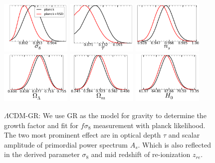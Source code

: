\begin{figure} 
\includegraphics[width=0.3\textwidth]{plots/planck-RSD-GR-sigma8.png}
\includegraphics[width=0.3\textwidth]{plots/planck-RSD-GR-tau.png}
\includegraphics[width=0.3\textwidth]{plots/planck-RSD-GR-ns.png}
\includegraphics[width=0.3\textwidth]{plots/planck-RSD-GR-omegal.png}
\includegraphics[width=0.3\textwidth]{plots/planck-RSD-GR-omegam.png}
\includegraphics[width=0.3\textwidth]{plots/planck-RSD-GR-H0.png}
\caption{ $\Lambda$CDM-GR: We use GR as the model for gravity to determine the growth factor and fit for $f\sigma_8$ measurement with planck likelihood. The two most prominent effect are in optical depth $\tau$ and scalar amplitude of primordial power spectrum $A_s$. Which is also reflected in the derived parameter $\sigma_8$ and mid redshift of re-ionization $z_{re}$.}
\label{fig:LCDM}
\end{figure}

